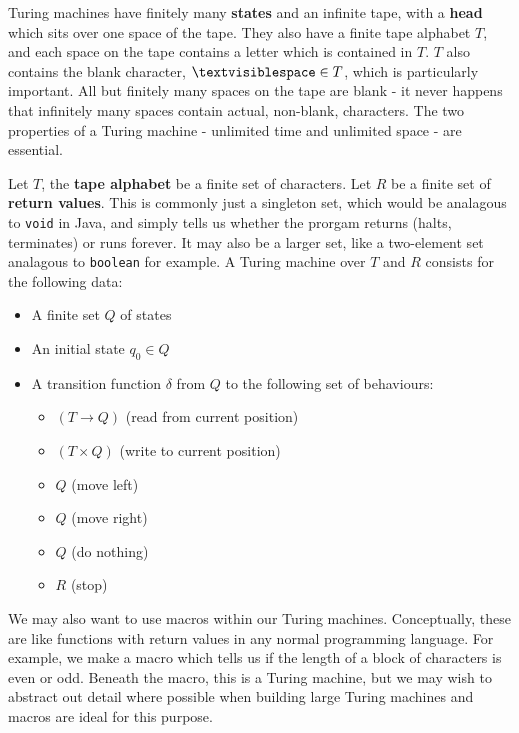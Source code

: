 \documentclass[11pt]{article}
\begin{document}
	\par 
	Turing machines have finitely many \textbf{states} and an infinite tape, with a \textbf{head} which sits over one space of the tape. They also have a finite tape alphabet $T$, and each space on the tape contains a letter which is contained in $T$. $T$ also contains the blank character, $\textvisiblespace \in T$, which is particularly important. All but finitely many spaces on the tape are blank - it never happens that infinitely many spaces contain actual, non-blank, characters. The two properties of a Turing machine - unlimited time and unlimited space - are essential.
	
	\par 
	Let $T$, the \textbf{tape alphabet} be a finite set of characters. Let $R$ be a finite set of \textbf{return values}. This is commonly just a singleton set, which would be analagous to \texttt{void} in Java, and simply tells us whether the prorgam returns (halts, terminates) or runs forever. It may also be a larger set, like a two-element set analagous to \texttt{boolean} for example. A Turing machine over $T$ and $R$ consists for the following data:
	\begin{itemize}
		\item A finite set $Q$ of states
		\item An initial state $q_{0} \in Q$
		\item A transition function $\delta$ from $Q$ to the following set of behaviours:
			\begin{itemize}
				\item $(T \rightarrow Q)$ (read from current position)
				\item $(T \times Q)$ (write to current position)
				\item $Q$ (move left)
				\item $Q$ (move right)
				\item $Q$ (do nothing)
				\item $R$ (stop)
			\end{itemize}
	\end{itemize}
	
	We may also want to use macros within our Turing machines. Conceptually, these are like functions with return values in any normal programming language. For example, we make a macro which tells us if the length of a block of characters is even or odd. Beneath the macro, this is a Turing machine, but we may wish to abstract out detail where possible when building large Turing machines and macros are ideal for this purpose.
	
\end{document}
